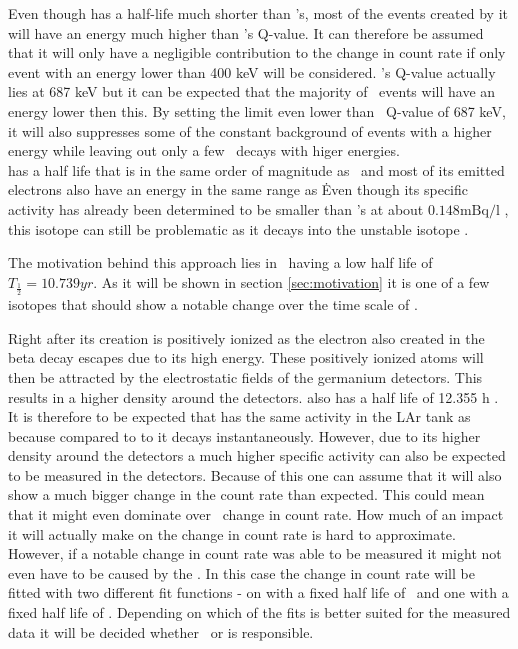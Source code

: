 Even though  has a half-life much shorter than \Kr's, most of the events created by it will have an energy much higher than \Kr's Q-value.
It can therefore be assumed that it will only have a negligible contribution to the change in count rate if only event with an energy lower than 400 keV will be considered.
\Kr's Q-value actually lies at 687 keV but it can be expected that the majority of \Kr\ events will have an energy lower then this.
By setting the limit even lower than \Kr\ Q-value of 687 keV, it will also suppresses some of the constant background of events with a higher energy while leaving out only a few \Kr\ decays with higer energies.
\\

 has a half life that is in the same order of magnitude as \Kr\ and most of its emitted electrons also have an energy in the same range as \Kr\.
Even though its specific activity has already been determined to be smaller than \Kr's at about $0.148\mathrm{mBq/l}$ \cite{becerici_schmidt_results_2014}, this isotope can still be problematic as it decays into the unstable isotope .





The motivation behind this approach lies in \Kr\ having a low half life of $T_{\frac{1}{2}} = 10.739\unit{yr}$.
As it will be shown in section \ref{sec:motivation} it is one of a few isotopes that should show a notable change over the time scale of \PII.









Right after its creation  is positively ionized as the electron also created in the beta decay escapes due to its high energy.
These positively ionized  atoms will then be attracted by the electrostatic fields of the germanium detectors.
This results in a higher  density around the detectors.
 also has a half life of 12.355 h \cite{chen_nuclear_2016}.
It is therefore to be expected that  has the same activity in the LAr tank as  because compared to to  it decays instantaneously.
However, due to its higher density around the detectors a much higher specific activity can also be expected to be measured in the detectors.
Because of this one can assume that it will also show a much bigger change in the count rate than expected.
This could mean that it might even dominate over \Kr\ change in count rate.
How much of an impact it will actually make on the change in count rate is hard to approximate.
However, if a notable change in count rate was able to be measured it might not even have to be caused by the \Kr.
In this case the change in count rate will be fitted with two different fit functions - on with a fixed half life of \Kr\ and one with a fixed half life of .
Depending on which of the fits is better suited for the measured data it will be decided whether \Kr\ or  is responsible. 

